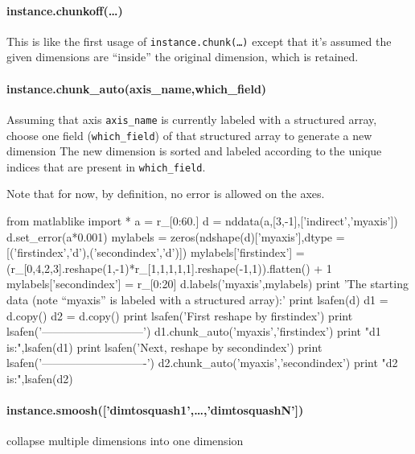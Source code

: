 \paragraph{instance.chunkoff(\ldots)}
This is like the first usage of \texttt{instance.chunk(\ldots)} except that it's assumed the given dimensions are ``inside'' the original dimension, which is retained.
\paragraph{instance.chunk\_auto(axis\_name,which\_field)}
Assuming that axis \texttt{axis\_name} is currently labeled with a structured array, choose one field (\texttt{which\_field}) of that structured array to generate a new dimension
The new dimension is sorted and labeled according to the unique indices that are present in \texttt{which\_field}.

Note that for now, by definition, no error is allowed on the axes.

\begin{python}[on]
from matlablike import *
a = r_[0:60.]
d = nddata(a,[3,-1],['indirect','myaxis'])
d.set_error(a*0.001)
mylabels = zeros(ndshape(d)['myaxis'],dtype = [('firstindex','d'),('secondindex','d')])
mylabels['firstindex'] = (r_[0,4,2,3].reshape(1,-1)*r_[1,1,1,1,1].reshape(-1,1)).flatten() + 1
mylabels['secondindex'] = r_[0:20]
d.labels('myaxis',mylabels)
print 'The starting data (note ``myaxis'' is labeled with a structured array):\n\n'
print lsafen(d)
d1 = d.copy()
d2 = d.copy()
print lsafen('First reshape by firstindex')
print lsafen('---------------------------')
d1.chunk_auto('myaxis','firstindex')
print "d1 is:",lsafen(d1)
print lsafen('Next, reshape by secondindex')
print lsafen('----------------------------')
d2.chunk_auto('myaxis','secondindex')
print "d2 is:",lsafen(d2)
\end{python}

\paragraph{instance.smoosh(['dimtosquash1',\ldots,'dimtosquashN'])}
collapse multiple dimensions into one dimension

